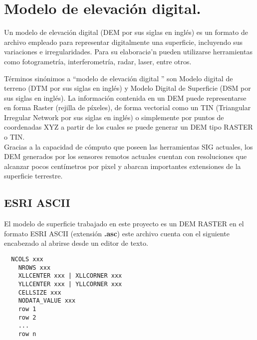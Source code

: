 \section{Modelo de elevaci\'{o}n digital.}


Un modelo de elevaci\'{o}n digital (DEM por sus siglas en ingl\'{e}s) es un formato de archivo empleado para representar digitalmente una superficie, incluyendo sus variaciones e irregularidades. Para su elaboraci\o'n pueden utilizarse herramientas como fotogrametr\'ia, interferometr\'ia, radar, laser, entre otros. \cite{whatisadem}


T\'{e}rminos sin\'{o}nimos a  ``modelo de elevaci\'{o}n digital '' son Modelo digital de terreno (DTM por
sus siglas en ingl\'{e}s) y Modelo Digital de Superficie (DSM por sus siglas en ingl\'{e}s).
La informaci\'{o}n contenida en un DEM puede representarse en forma Raster (rejilla de
p\'ixeles), de forma vectorial como un TIN (Triangular Irregular Network por sus siglas en
ingl\'{e}s) o simplemente por puntos de coordenadas XYZ a partir de los cuales se puede
generar un DEM tipo RASTER o TIN. \cite{tachikawa1994development} \\
 Gracias a la capacidad de c\'{o}mputo que poseen las
herramientas SIG actuales, los DEM generados por los sensores remotos actuales cuentan
con resoluciones que alcanzar pocos cent\'imetros por pixel y abarcan importantes extensiones de la superficie terrestre. \cite{zhang2002comparison}  \cite{hirt2010comparison}
\\
\subsection{ESRI ASCII}

El modelo de superficie trabajado en este proyecto es un DEM RASTER en el formato ESRI
ASCII (extensi\'{o}n \textbf{.asc}) este archivo cuenta con el siguiente encabezado al abrirse desde un
editor de texto.

\begin{lstlisting}
  NCOLS xxx
    NROWS xxx
    XLLCENTER xxx | XLLCORNER xxx
    YLLCENTER xxx | YLLCORNER xxx
    CELLSIZE xxx
    NODATA_VALUE xxx
    row 1
    row 2
    ...
    row n
\end{lstlisting}

